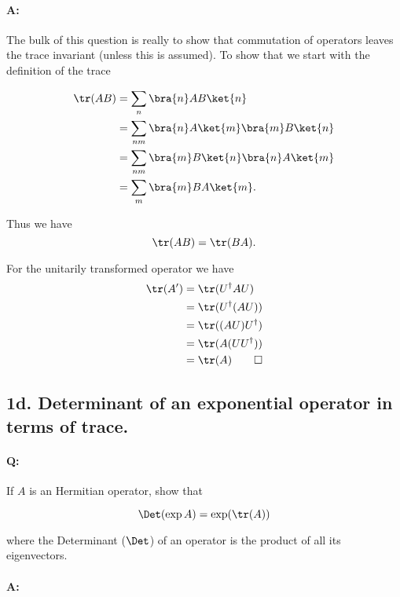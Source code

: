 \paragraph{A:} 

The bulk of this question is really to show that commutation of operators leaves the trace invariant (unless this is assumed).  To show that we start with the definition of the trace

\begin{align*}
\tr(AB) 
&= \sum_n \bra{n} A B \ket{n} \\
&= \sum_{n m} \bra{n} A \ket{m} \bra{m} B \ket{n} \\
&= \sum_{n m} 
\bra{m} B \ket{n} 
\bra{n} A \ket{m} 
\\
&= \sum_{m} \bra{m} B A \ket{m}.
\end{align*}

Thus we have
\begin{equation}\label{eqn:qmIexamPractice2008Dec:1b:10}
\tr(A B) = \tr( B A ).
\end{equation}

For the unitarily transformed operator we have
\begin{align*}
\tr(A') 
&= \tr( U^\dagger A U ) \\
&= \tr( U^\dagger (A U) ) \\
&= \tr( (A U) U^\dagger ) \\
&= \tr( A (U U^\dagger) ) \\
&= \tr( A ) \qquad \square
\end{align*}

\subsection{1d.  Determinant of an exponential operator in terms of trace.}

\paragraph{Q:} If $A$ is an Hermitian operator, show that

\begin{equation}\label{eqn:qmIexamPractice2008Dec:1d:10}
\Det( \exp A ) = \exp ( \tr(A) )
\end{equation}

where the Determinant ($\Det$) of an operator is the product of all its eigenvectors.

\paragraph{A:}

